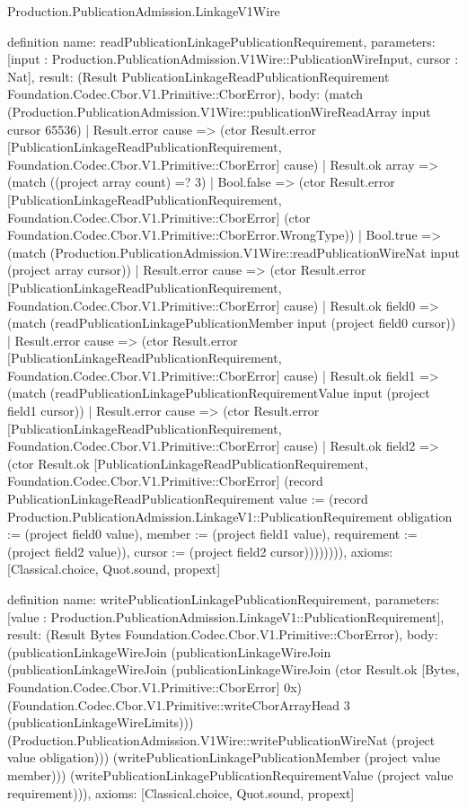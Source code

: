 \begin{lexlean}{Production.PublicationAdmission.LinkageV1Wire}
\begin{semanticmodule}
definition{
  name: readPublicationLinkagePublicationRequirement,
  parameters: [input : Production.PublicationAdmission.V1Wire::PublicationWireInput, cursor : Nat],
  result: (Result PublicationLinkageReadPublicationRequirement Foundation.Codec.Cbor.V1.Primitive::CborError),
  body: (match (Production.PublicationAdmission.V1Wire::publicationWireReadArray input cursor 65536)
    | Result.error cause => (ctor Result.error [PublicationLinkageReadPublicationRequirement, Foundation.Codec.Cbor.V1.Primitive::CborError] cause)
    | Result.ok array => (match ((project array count) =? 3)
      | Bool.false => (ctor Result.error [PublicationLinkageReadPublicationRequirement, Foundation.Codec.Cbor.V1.Primitive::CborError] (ctor Foundation.Codec.Cbor.V1.Primitive::CborError.WrongType))
      | Bool.true => (match (Production.PublicationAdmission.V1Wire::readPublicationWireNat input (project array cursor))
        | Result.error cause => (ctor Result.error [PublicationLinkageReadPublicationRequirement, Foundation.Codec.Cbor.V1.Primitive::CborError] cause)
        | Result.ok field0 => (match (readPublicationLinkagePublicationMember input (project field0 cursor))
          | Result.error cause => (ctor Result.error [PublicationLinkageReadPublicationRequirement, Foundation.Codec.Cbor.V1.Primitive::CborError] cause)
          | Result.ok field1 => (match (readPublicationLinkagePublicationRequirementValue input (project field1 cursor))
            | Result.error cause => (ctor Result.error [PublicationLinkageReadPublicationRequirement, Foundation.Codec.Cbor.V1.Primitive::CborError] cause)
            | Result.ok field2 => (ctor Result.ok [PublicationLinkageReadPublicationRequirement, Foundation.Codec.Cbor.V1.Primitive::CborError] (record PublicationLinkageReadPublicationRequirement {value := (record Production.PublicationAdmission.LinkageV1::PublicationRequirement {obligation := (project field0 value), member := (project field1 value), requirement := (project field2 value)}), cursor := (project field2 cursor)}))))))),
  axioms: [Classical.choice, Quot.sound, propext]
}

definition{
  name: writePublicationLinkagePublicationRequirement,
  parameters: [value : Production.PublicationAdmission.LinkageV1::PublicationRequirement],
  result: (Result Bytes Foundation.Codec.Cbor.V1.Primitive::CborError),
  body: (publicationLinkageWireJoin (publicationLinkageWireJoin (publicationLinkageWireJoin (publicationLinkageWireJoin (ctor Result.ok [Bytes, Foundation.Codec.Cbor.V1.Primitive::CborError] 0x) (Foundation.Codec.Cbor.V1.Primitive::writeCborArrayHead 3 (publicationLinkageWireLimits))) (Production.PublicationAdmission.V1Wire::writePublicationWireNat (project value obligation))) (writePublicationLinkagePublicationMember (project value member))) (writePublicationLinkagePublicationRequirementValue (project value requirement))),
  axioms: [Classical.choice, Quot.sound, propext]
}


\end{semanticmodule}
\end{lexlean}
